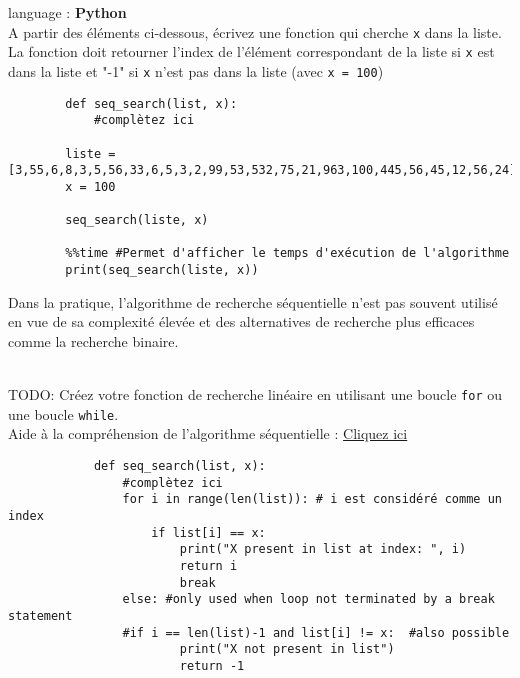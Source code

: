 \begin{Exercice}[5 minutes] language : \textbf{Python}\\

A partir des éléments ci-dessous, écrivez une fonction qui cherche \lstinline{x} dans la liste.\\La fonction doit retourner l'index de l'élément correspondant de la liste si \lstinline{x} est dans la liste et "-1" si \lstinline{x} n'est pas dans la liste (avec \lstinline{x = 100})\\

    \begin{lstlisting}
        def seq_search(list, x):
            #complètez ici
            
        liste = [3,55,6,8,3,5,56,33,6,5,3,2,99,53,532,75,21,963,100,445,56,45,12,56,24]
        x = 100
        
        seq_search(liste, x)
        
        %%time #Permet d'afficher le temps d'exécution de l'algorithme 
        print(seq_search(liste, x))
    \end{lstlisting}

Dans la pratique, l'algorithme de recherche séquentielle n'est pas souvent utilisé en vue de sa complexité élevée et des alternatives de recherche plus efficaces comme la recherche binaire.\\\\

    \begin{conseil}
        TODO: Créez votre fonction de recherche linéaire en utilisant une boucle \lstinline{for} ou une boucle \lstinline{while}.\\
        Aide à la compréhension de l'algorithme séquentielle : \href{https://runestone.academy/runestone/books/published/pythonds/SortSearch/TheSequentialSearch.html#lst-seqsearchpython}{Cliquez ici}
    \end{conseil}
    
    \begin{solution}
        \begin{lstlisting}
            def seq_search(list, x):
                #complètez ici
                for i in range(len(list)): # i est considéré comme un index
                    if list[i] == x:
                        print("X present in list at index: ", i)
                        return i
                        break
                else: #only used when loop not terminated by a break statement
                #if i == len(list)-1 and list[i] != x:  #also possible
                        print("X not present in list")
                        return -1
            

\end{lstlisting}
\end{solution}
\end{Exercice}

